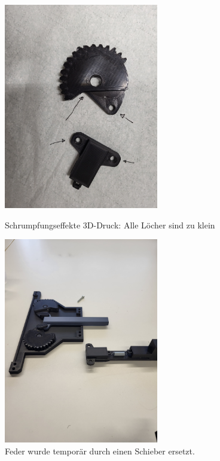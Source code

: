\documentclass[../main.tex]{subfiles}
\begin{document}
\begin{figure}[H]
    \centering
    \begin{minipage}[t]{0.45\textwidth}
        \centering
        \includegraphics[height=9cm]{img/greifarmtest/prototyp_test_loecher.jpeg}
        \caption{Schrumpfungseffekte 3D-Druck: Alle Löcher sind zu klein}
        \label{fig:hardware_test_loecher}
    \end{minipage}%
    \hfill
    \begin{minipage}[t]{0.45\textwidth}
        \centering
        \includegraphics[height=9cm]{img/greifarmtest/prototyp_test_schieber.jpeg}
        \caption{Feder wurde temporär durch einen Schieber ersetzt.}
        \label{fig:hardware_test_schieber}
    \end{minipage}
\end{figure}
\end{document}
